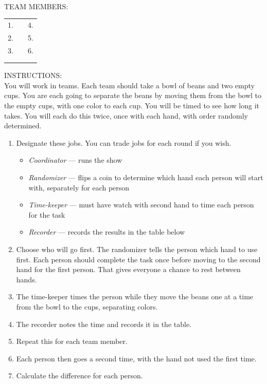 \documentclass[twoside,openany]{tufte-book}
\begin{document}
\pagebreak
\begin{flushleft}
\textbf{} \\
\end{flushleft}

\noindent TEAM MEMBERS:\\ 
\vspace{10pt}
\begin{tabular}{p{2in}p{1in}p{2in}}
1. \hrulefill & & 4. \hrulefill  \\
2. \hrulefill & & 5. \hrulefill  \\
3. \hrulefill & & 6. \hrulefill  \\ \\ \\
\end{tabular}

\noindent INSTRUCTIONS:\\ 
You will work in teams. Each team should take a bowl of beans and two empty cups. You are each going to separate the beans by moving them from the bowl to the empty cups, with one color to each cup. You will be timed to see how long it takes. You will each do this twice, once with each hand, with order randomly determined.

\renewcommand{\labelenumi}{\arabic{enumi}.}
\begin{enumerate} [leftmargin=1cm, itemsep=.2em]
\item Designate these jobs. You can trade jobs for each round if you wish.
	\renewcommand{\labelitemi}{$\filledsquare$}
	\begin{itemize} [leftmargin=1cm, itemsep=.2em]
	\item \textit{Coordinator} --- runs the show
	\item \textit{Randomizer} --- flips a coin to determine which hand each person will start with, separately for each person
	\item \textit{Time-keeper} --- must have watch with second hand to time each person for the task
	\item \textit{Recorder} --- records the results in the table below
	\end{itemize}
\item Choose who will go first. The randomizer tells the person which hand to use first. Each person should complete the task once before moving to the second hand for the first person. That gives everyone a chance to rest between hands.
\item The time-keeper times the person while they move the beans one at a time from the bowl to the cups, separating colors. 
\item The recorder notes the time and records it in the table.
\item Repeat this for each team member.
\item Each person then goes a second time, with the hand not used the first time.
\item Calculate the difference for each person.
\end{enumerate}
\pagebreak
\end{document}
